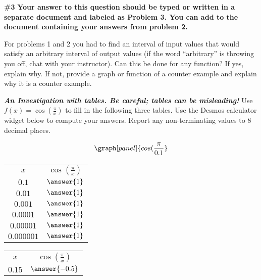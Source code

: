 \documentclass[handout,nooutcomes]{ximera}
\begin{document}
\begin{problem}{\textbf{\#3}}
\textbf{Your answer to this question should be typed or written in a separate document and labeled as Problem 3. You can add to the document containing your answers from problem 2.}

  For problems 1 and 2 you had to find an interval of input values that would satisfy an arbitrary interval of output values (if the word ``arbitrary'' is throwing you off, chat with your instructor). Can this be done for any function? If yes, explain why. If not, provide a graph or function of a counter example and explain why it is a counter example.
\end{problem}

\begin{problem}{\textbf{\textit{An Investigation with tables. Be careful; tables can be misleading! }}}
Use $\displaystyle f(x)=\cos\left(\frac{\pi}{x}\right)$ to fill in the following three tables.
Use the Desmos calculator widget below to compute your answers. Report any non-terminating values to 8 decimal places.

\[
\graph[panel]{cos(\frac{\pi}{0.1}}
\]

\begin{tabular}{|c|c|}

\hline
		$x$ & $\cos\left(\frac{\pi}{x}\right)$\\
		
        $0.1$ & $\answer{1}$\\
		
		$0.01$ & $\answer{1}$\\
		
		$0.001$ & $\answer{1}$\\
		
		$0.0001$ & $\answer{1}$\\
		
		$0.00001$ & $\answer{1}$ \\
		
		$0.000001$ & $\answer{1}$ \\

		
\end{tabular}

\bigskip

\begin{tabular}{|c|c|}

\hline
		$x$ & $\cos\left(\frac{\pi}{x}\right)$\\
		
        $0.15$ & $\answer{-0.5}$\\
		

\end{tabular}
\end{problem}
\end{document}
